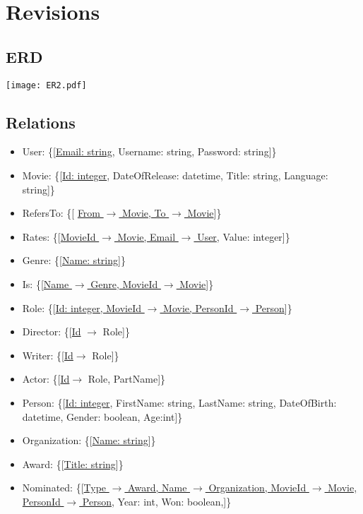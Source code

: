 \section{Revisions}

\subsection{ERD}
\texttt{[image: ER2.pdf]}

\subsection{Relations}
\begin{itemize}
\item User: \{[\underline{Email: string}, Username: string, Password: string]\}

\item Movie: \{[\underline{Id: integer}, DateOfRelease: datetime, Title: string, Language: string]\}

\item RefersTo: \{[ \underline{From $\rightarrow$ Movie, To $\rightarrow$ Movie}]\}

\item Rates: \{[\underline{MovieId $\rightarrow$ Movie, Email $ \rightarrow $ User}, Value: integer]\}

\item Genre: \{[\underline{Name: string}]\}

\item Is: \{[\underline{Name $\rightarrow$ Genre, MovieId $\rightarrow$ Movie}]\}

\item Role: \{[\underline{Id: integer, MovieId $\rightarrow$ Movie, PersonId $ \rightarrow $ Person}]\}

\item Director: \{[\underline{Id} $ \rightarrow $ Role]\}

\item Writer: \{[\underline{Id}$ \rightarrow $ Role]\}

\item Actor: \{[\underline{Id}$ \rightarrow $ Role, PartName]\}

\item Person: \{[\underline{Id: integer}, FirstName: string, LastName: string, DateOfBirth: datetime, Gender: boolean, Age:int]\}

\item Organization: \{[\underline{Name: string}]\}

\item Award: \{[\underline{Title: string}]\}

\item Nominated: \{[\underline{Type $ \rightarrow $ Award, Name $ \rightarrow $ Organization, MovieId $\rightarrow$ Movie,}\\
\underline{PersonId $ \rightarrow $ Person}, Year: int, Won: boolean,]\}
\end{itemize}

